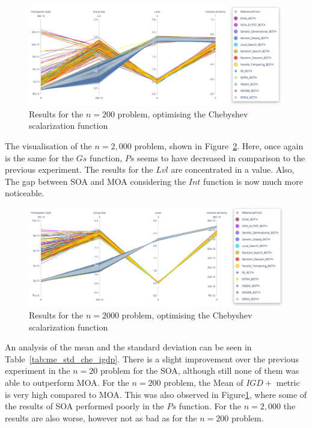 \begin{figure}[H]
    \centering
    \includegraphics[width=\textwidth]{images/chebyshev_200.png}
    \caption{Results for the $n=200$ problem, optimising the Chebyshev scalarization function}
    \label{fig:front_chebyshev_200}
\end{figure}

The visualisation of the $n=2,000$ problem, shown in Figure~\ref{fig:front_chebyshev_2000}. Here, once again is the same for the $Gs$ function, $Ps$ seems to have decreased in comparison to the previous experiment. The results for the $Lvl$ are concentrated in a value. Also, The gap between SOA and MOA considering the $Int$ function is now much more noticeable.

\begin{figure}[H]
    \centering
    \includegraphics[width=\textwidth]{images/chebyshev_2000.png}
    \caption{Results for the $n=2000$ problem, optimising the Chebyshev scalarization function}
    \label{fig:front_chebyshev_2000}
\end{figure}

An analysis of the mean and the standard deviation can be seen in Table~\ref{tab:me_std_che_igdp}. There is a slight improvement over the previous experiment in the $n=20$ problem for the SOA, although still none of them was able to outperform MOA. For the $n=200$ problem, the Mean of $IGD+$ metric is very high compared to MOA. This was also observed in Figure\ref{fig:front_chebyshev_200}, where some of the results of SOA performed poorly in the $Ps$ function. For the $n=2,000$ the results are also worse, however not as bad as for the $n=200$ problem.

